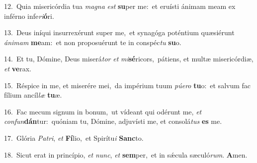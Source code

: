 {\numbfont\textcolor{\numbcolor}{12.}}~Quia misericórdia tua \textit{ma}\-\textit{gna} \textit{est} \textbf{su}\-per me:~\star et eruísti ánimam meam ex inférno infe\-\textit{ri}\-\textbf{ó}ri.\par
{\numbfont\textcolor{\numbcolor}{13.}}~Deus iníqui insurrexérunt super me,~\dagger et synagóga poténtium quæsiérunt \textit{á}\-\textit{ni}\textit{mam} \textbf{me}\-am:~\star et non proposuérunt te in conspéc\textit{tu} \textbf{su}\-o.\par
{\numbfont\textcolor{\numbcolor}{14.}}~Et tu, Dómine, Deus miserá\textit{tor} \textit{et} \textit{mi}\-\textbf{sé}ricors,~\star pátiens, et multæ misericórdiæ, \textit{et} \textbf{ve}\-rax.\par
{\numbfont\textcolor{\numbcolor}{15.}}~Réspice in me, et miserére mei,~\dagger da impérium tuum \textit{pú}\-\textit{e}\textit{ro} \textbf{tu}\-o:~\star et salvum fac fílium ancíl\textit{læ} \textbf{tu}\-æ.\par
{\numbfont\textcolor{\numbcolor}{16.}}~Fac mecum signum in bonum,~\dagger ut vídeant qui odérunt me, \textit{et} \textit{con}\-\textit{fun}\textbf{dán}tur:~\star quóniam tu, Dómine, adjuvísti me, et consolá\textit{tus} \textbf{es} me.\par
{\numbfont\textcolor{\numbcolor}{17.}}~Glória \textit{Pa}\-\textit{tri}, \textit{et} \textbf{Fí}\-lio,~\star et Spirítu\textit{i} \textbf{Sanc}\-to.\par
{\numbfont\textcolor{\numbcolor}{18.}}~Sicut erat in princípio, \textit{et} \textit{nunc}\-, \textit{et} \textbf{sem}\-per,~\star et in sǽcula sæculó\-\textit{rum}\-. \textbf{A}\-men.\par
